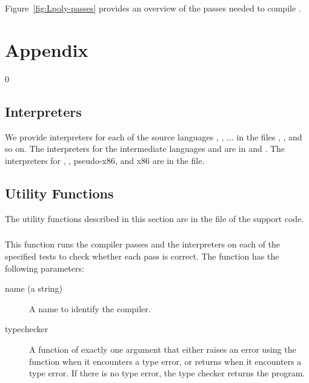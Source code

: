 \documentclass[7x10]{TimesAPriori_MIT}%
\def\racketEd{0}
\def\edition{1}
\numberwithin{theorem}{chapter}
\numberwithin{definition}{chapter}
\numberwithin{equation}{chapter}
\begin{document}
Figure~\ref{fig:Lpoly-passes} provides an overview of the passes
needed to compile \LangPoly{}.



\clearpage

\appendix

\chapter{Appendix}
\setcounter{footnote}{0}

{\if\edition\racketEd

\section{Interpreters}
\label{appendix:interp}

We provide interpreters for each of the source languages \LangInt{},
\LangVar{}, $\ldots$ in the files ,
, and so on.  The interpreters for the
intermediate languages \LangCVar{} and \LangCIf{} are in
 and .  The interpreters for
\LangCVec{}, \LangCFun{}, pseudo-x86, and x86 are in the
 file.

\section{Utility Functions}
\label{appendix:utilities}

The utility functions described in this section are in the
 file of the support code.

\paragraph{}

This function runs the compiler passes and the interpreters on each of
the specified tests to check whether each pass is correct. The
 function has the following parameters:
\begin{description}
\item[name (a string)] A name to identify the compiler.
\item[typechecker] A function of exactly one argument that either
  raises an error using the  function when it encounters a
  type error, or returns  when it encounters a type
  error. If there is no type error, the type checker returns the
  program.


\end{description}}
\end{document}
